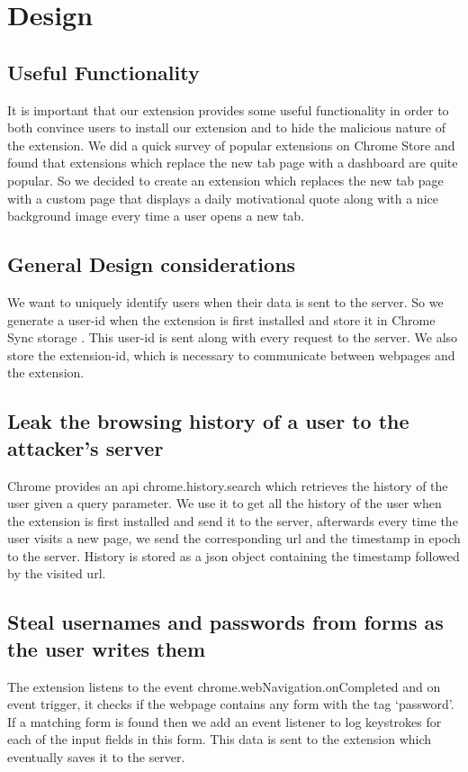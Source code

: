 \chapter{Design}
\section{Useful Functionality}
It is important that our extension provides some useful functionality in order to both convince users to install our extension and to hide the malicious nature of the extension. We did a quick survey of popular extensions on Chrome Store and found that extensions which replace the new tab page with a dashboard are quite popular. So we decided to create an extension which replaces the new tab page with a custom page that displays a daily motivational quote along with a nice background image every time a user opens a new tab.

\section{General Design considerations}
We want to uniquely identify users when their data is sent to the server. So we generate a user-id when the extension is first installed and store it in Chrome Sync storage . This user-id is sent along with every request to the server. We also store the extension-id, which is necessary to communicate between webpages and the extension.

\section{Leak the browsing history of a user to the attacker's server}
Chrome provides an api chrome.history.search which retrieves the history of the user given a query parameter.  We use it to get all the history of the user when the extension is first installed and send it to the server, afterwards every time the user visits a new page, we send the corresponding url and the timestamp in epoch to the server.  History is stored as a json object containing the timestamp followed by the visited url.

\section{Steal usernames and passwords from forms as the user writes them}
The extension listens to the event chrome.webNavigation.onCompleted and on event trigger, it checks if the webpage contains any form with the tag ‘password’. If a matching form is found then we add an event listener to log keystrokes for each of the input fields in this form. This data is sent to the extension which eventually saves it to the server.

